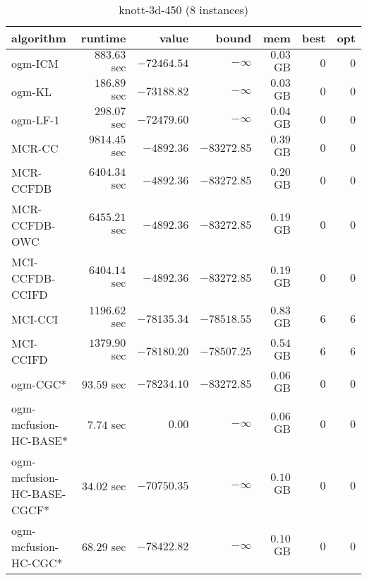 \begin{table}[H]
\scriptsize
\centering
\caption{knott-3d-450 (8 instances)}
\label{tab:smalltable-knott-3d-450}
\begin{tabular}{lrrrrrr}
\toprule
           algorithm &       runtime     &         value &         bound &           mem &     best &      opt   \\ \midrule 
             ogm-ICM & $       883.63$ sec & $    -72464.54$ & $-\infty$ & $         0.03$ GB & $       0$ & $       0$ \\ 
              ogm-KL & $       186.89$ sec & $    -73188.82$ & $-\infty$ & $         0.03$ GB & $       0$ & $       0$ \\ 
            ogm-LF-1 & $       298.07$ sec & $    -72479.60$ & $-\infty$ & $         0.04$ GB & $       0$ & $       0$ \\ 
\cmidrule{1-1} 
              MCR-CC & $      9814.45$ sec & $     -4892.36$ & $    -83272.85$ & $         0.39$ GB & $       0$ & $       0$ \\ 
           MCR-CCFDB & $      6404.34$ sec & $     -4892.36$ & $    -83272.85$ & $         0.20$ GB & $       0$ & $       0$ \\ 
       MCR-CCFDB-OWC & $      6455.21$ sec & $     -4892.36$ & $    -83272.85$ & $         0.19$ GB & $       0$ & $       0$ \\ 
\cmidrule{1-1} 
     MCI-CCFDB-CCIFD & $      6404.14$ sec & $     -4892.36$ & $    -83272.85$ & $         0.19$ GB & $       0$ & $       0$ \\ 
             MCI-CCI & $      1196.62$ sec & $    -78135.34$ & $    -78518.55$ & $         0.83$ GB & $       6$ & $       6$ \\ 
           MCI-CCIFD & $      1379.90$ sec & $    -78180.20$ & $    -78507.25$ & $         0.54$ GB & $       6$ & $       6$ \\ 
\cmidrule{1-1} 
            ogm-CGC* & $        93.59$ sec & $    -78234.10$ & $    -83272.85$ & $         0.06$ GB & $       0$ & $       0$ \\ 
ogm-mcfusion-HC-BASE* & $         7.74$ sec & $         0.00$ & $-\infty$ & $         0.06$ GB & $       0$ & $       0$ \\ 
ogm-mcfusion-HC-BASE-CGCF* & $        34.02$ sec & $    -70750.35$ & $-\infty$ & $         0.10$ GB & $       0$ & $       0$ \\ 
ogm-mcfusion-HC-CGC* & $        68.29$ sec & $    -78422.82$ & $-\infty$ & $         0.10$ GB & $       0$ & $       0$ \\ 

\end{tabular}
\end{table}
